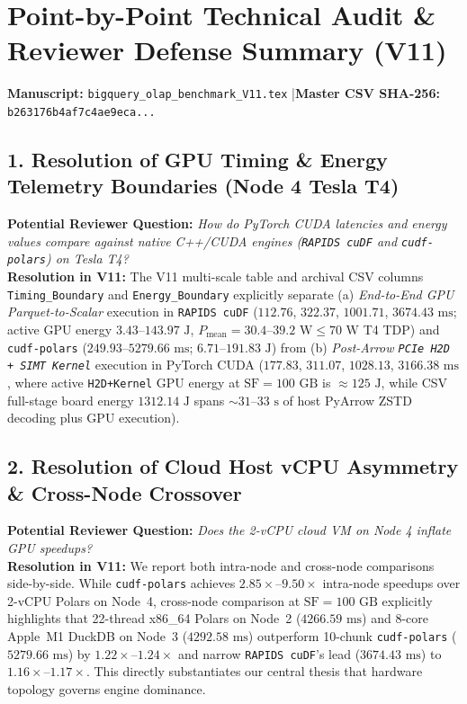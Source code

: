 \documentclass[11pt,a4paper]{article}
\begin{document}
\section*{Point-by-Point Technical Audit \& Reviewer Defense Summary (V11)}
\noindent\textbf{Manuscript:} \texttt{bigquery\_olap\_benchmark\_V11.tex} \quad|\quad \textbf{Master CSV SHA-256:} \texttt{b263176b4af7c4ae9eca...}

\subsection*{1. Resolution of GPU Timing \& Energy Telemetry Boundaries (Node 4 Tesla T4)}
\textbf{Potential Reviewer Question:} \emph{How do PyTorch CUDA latencies and energy values compare against native C++/CUDA engines (\texttt{RAPIDS cuDF} and \texttt{cudf-polars}) on Tesla T4?}\\
\textbf{Resolution in V11:} The V11 multi-scale table and archival CSV columns \texttt{Timing\_Boundary} and \texttt{Energy\_Boundary} explicitly separate (a) \emph{End-to-End GPU Parquet-to-Scalar} execution in \texttt{RAPIDS cuDF} ($112.76$, $322.37$, $1001.71$, $3674.43\text{ ms}$; active GPU energy $3.43\text{--}143.97\text{ J}$, $P_{\text{mean}}=30.4\text{--}39.2\text{ W} \le 70\text{ W}$ T4 TDP) and \texttt{cudf-polars} ($249.93\text{--}5279.66\text{ ms}$; $6.71\text{--}191.83\text{ J}$) from (b) \emph{Post-Arrow \texttt{PCIe H2D + SIMT Kernel}} execution in PyTorch CUDA ($177.83$, $311.07$, $1028.13$, $3166.38\text{ ms}$, where active \texttt{H2D+Kernel} GPU energy at $\text{SF}=100\text{ GB}$ is $\approx 125\text{ J}$, while CSV full-stage board energy $1312.14\text{ J}$ spans $\sim 31\text{--}33\text{ s}$ of host PyArrow ZSTD decoding plus GPU execution).

\subsection*{2. Resolution of Cloud Host vCPU Asymmetry \& Cross-Node Crossover}
\textbf{Potential Reviewer Question:} \emph{Does the 2-vCPU cloud VM on Node 4 inflate GPU speedups?}\\
\textbf{Resolution in V11:} We report both intra-node and cross-node comparisons side-by-side. While \texttt{cudf-polars} achieves $2.85\times\text{--}9.50\times$ intra-node speedups over 2-vCPU Polars on Node~4, cross-node comparison at $\text{SF}=100\text{ GB}$ explicitly highlights that 22-thread x86\_64 Polars on Node~2 ($4266.59\text{ ms}$) and 8-core Apple~M1 DuckDB on Node~3 ($4292.58\text{ ms}$) outperform 10-chunk \texttt{cudf-polars} ($5279.66\text{ ms}$) by $1.22\times\text{--}1.24\times$ and narrow \texttt{RAPIDS cuDF}'s lead ($3674.43\text{ ms}$) to $1.16\times\text{--}1.17\times$. This directly substantiates our central thesis that hardware topology governs engine dominance.
\end{document}
